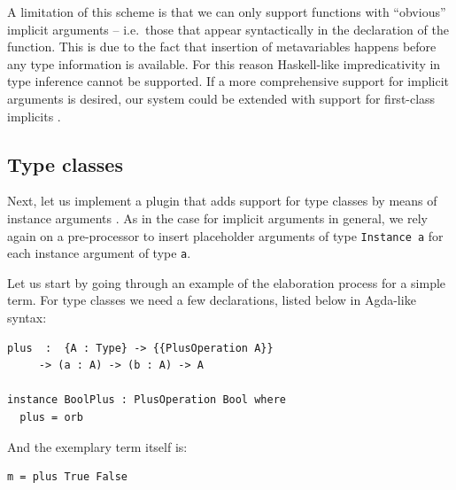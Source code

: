 A limitation of this scheme is that we can only support functions with
``obvious'' implicit arguments -- i.e.~those that appear syntactically
in the declaration of the function. This is due to the fact that
insertion of metavariables happens before any type information is
available. For this reason Haskell-like impredicativity
\citep{serranoQuickLookImpredicativity2020a} in type inference cannot be
supported. If a more comprehensive support for implicit arguments is
desired, our system could be extended with support for first-class
implicits \citep{kovacsElaborationFirstclassImplicit2020}.

\hypertarget{sec:case-typeclasses}{%
\subsection{Type classes}\label{sec:case-typeclasses}}

Next, let us implement a plugin that adds support for type classes by
means of instance arguments \citep{DevrieseP11-1}. As in the case for
implicit arguments in general, we rely again on a pre-processor to
insert placeholder arguments of type \texttt{Instance\ a} for each
instance argument of type \texttt{a}.

Let us start by going through an example of the elaboration process for
a simple term. For type classes we need a few declarations, listed below
in Agda-like syntax:

\begin{verbatim}
plus  :  {A : Type} -> {{PlusOperation A}}
     -> (a : A) -> (b : A) -> A

instance BoolPlus : PlusOperation Bool where
  plus = orb
\end{verbatim}

And the exemplary term itself is:

\begin{verbatim}
m = plus True False
\end{verbatim}

